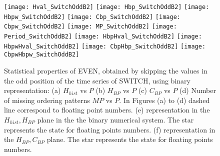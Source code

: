 \begin{figure}
	\texttt{[image: Hval\_SwitchOddB2]}
	\texttt{[image: Hbp\_SwitchOddB2]}
	\texttt{[image: Hbpw\_SwitchOddB2]}
	\texttt{[image: Cbp\_SwitchOddB2]}
	\texttt{[image: Cbpw\_SwitchOddB2]}
	\texttt{[image: MP\_SwitchOddB2]}
	\texttt{[image: Period\_SwitchOddB2]}
	\texttt{[image: HbpHval\_SwitchOddB2]}
	\texttt{[image: HbpwHval\_SwitchOddB2]}
	\texttt{[image: CbpHbp\_SwitchOddB2]}
	\texttt{[image: CbpwHbpw\_SwitchOddB2]}
	\caption{Statistical properties of EVEN, obtained by skipping the values in the odd position of the time series of  SWITCH,  using binary representation: (a) $H_{hist}$ vs $P$ (b) $H_{BP}$ vs $P$ (c) $C_{BP}$ vs $P$ (d) Number of missing ordering patterns $MP$ vs $P$. In Figures (a) to (d) dashed line correspond to floating point numbers. (e) representation in the $H_{hist},H_{BP}$ plane in the the binary numerical system.  The star represents the state for floating points numbers. (f) representation in the $H_{BP},C_{BP}$ plane.  The star represents the state for floating points numbers.  } \label{fig:seqimparbin}
\end{figure}
